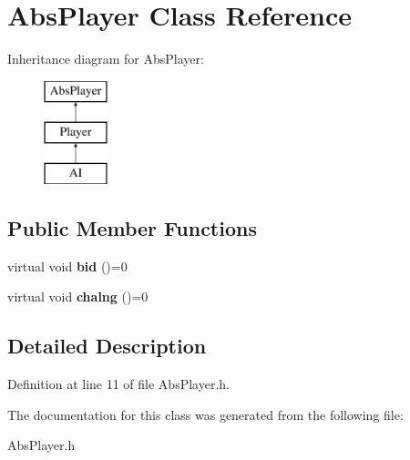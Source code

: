 \hypertarget{class_abs_player}{}\section{Abs\+Player Class Reference}
\label{class_abs_player}
Inheritance diagram for Abs\+Player\+:\begin{figure}[H]
\begin{center}
\leavevmode
\includegraphics[height=3.000000cm]{class_abs_player}
\end{center}
\end{figure}
\subsection*{Public Member Functions}
\begin{DoxyCompactItemize}
\item 
\hypertarget{class_abs_player_afa4d8a2ff833bf9345435f5fc9edcb5b}{}virtual void {\bfseries bid} ()=0\label{class_abs_player_afa4d8a2ff833bf9345435f5fc9edcb5b}

\item 
\hypertarget{class_abs_player_ae6035f09728fc47c3647a6da318ea058}{}virtual void {\bfseries chalng} ()=0\label{class_abs_player_ae6035f09728fc47c3647a6da318ea058}

\end{DoxyCompactItemize}


\subsection{Detailed Description}


Definition at line 11 of file Abs\+Player.\+h.



The documentation for this class was generated from the following file\+:\begin{DoxyCompactItemize}
\item 
Abs\+Player.\+h\end{DoxyCompactItemize}

